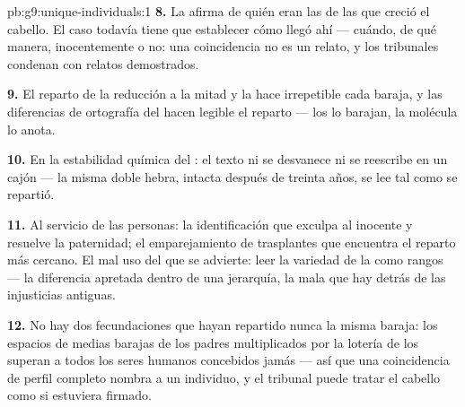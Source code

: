 \begin{solution}{pb:g9:unique-individuals:1}
\textbf{8.} La  afirma de quién eran las  de las que
creció el cabello. El caso todavía tiene que establecer cómo llegó ahí ---
cuándo, de qué manera, inocentemente o no: una coincidencia no es un
relato, y los tribunales condenan con relatos demostrados.

\textbf{9.} El reparto de la reducción a la mitad y la  hace
irrepetible cada baraja, y las diferencias de ortografía del  hacen
legible el reparto --- los  lo barajan, la molécula lo anota.

\textbf{10.} En la estabilidad química del : el texto ni se
desvanece ni se reescribe en un cajón --- la misma doble hebra, intacta
después de treinta años, se lee tal como se repartió.

\textbf{11.} Al servicio de las personas: la identificación que
exculpa al inocente y resuelve la paternidad; el emparejamiento de
trasplantes que encuentra el reparto más cercano. El mal uso del que se
advierte: leer la variedad de la  como rangos --- la diferencia
apretada dentro de una jerarquía, la mala  que hay detrás de
las injusticias antiguas.

\textbf{12.} No hay dos fecundaciones que hayan repartido nunca la
misma baraja: los espacios de medias barajas de los padres
multiplicados por la lotería de los  superan a todos los seres
humanos concebidos jamás --- así que una coincidencia de perfil
completo nombra a un individuo, y el tribunal puede tratar el cabello como
si estuviera firmado.
\end{solution}
